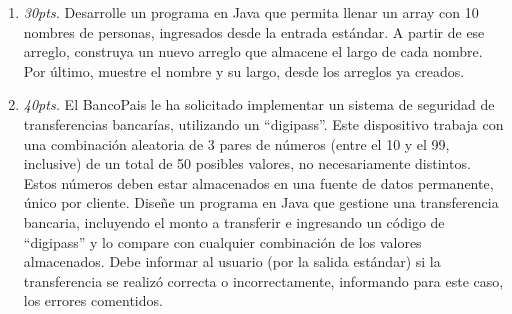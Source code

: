 \documentclass[10pt]{article}
\begin{document}
{\begin{enumerate}
\begin{multicols}{2}
		\end{multicols}

		\newpage

		\item \emph{30pts.} Desarrolle un programa en Java que permita llenar un array con 10 nombres de personas, ingresados desde la entrada est\'andar. A partir de ese arreglo, construya un nuevo arreglo que almacene el largo de cada nombre. Por \'ultimo, muestre el nombre y su largo, desde los arreglos ya creados.
		
		\newpage

		\item \emph{40pts.} El BancoPais le ha solicitado implementar un sistema de seguridad de transferencias bancar\'ias, utilizando un ``digipass''. Este dispositivo trabaja con una combinaci\'on aleatoria de 3 pares de n\'umeros (entre el 10 y el 99, inclusive) de un total de 50 posibles valores, no necesariamente distintos. Estos n\'umeros deben estar almacenados en una fuente de datos permanente, \'unico por cliente. Dise\~ne un programa en Java que gestione una transferencia bancaria, incluyendo el monto a transferir e ingresando un c\'odigo de ``digipass'' y lo compare con cualquier combinaci\'on de los valores almacenados. Debe informar al usuario (por la salida est\'andar) si la transferencia se realiz\'o correcta o incorrectamente, informando para este caso, los errores comentidos.

	\end{enumerate}}
\end{document}
